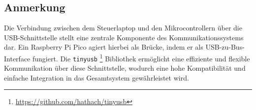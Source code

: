 \subsection{Anmerkung}\label{text:Methodik:Kommunikation:Anmerkung}

Die Verbindung zwischen dem Steuerlaptop und den Mikrocontrollern über die USB-Schnittstelle stellt eine zentrale Komponente des Kommunikationssystems dar. Ein Raspberry Pi Pico agiert hierbei als Brücke, indem er als USB-zu-Bus-Interface fungiert. Die \lstinline{tinyusb} \footnote{\url{https://github.com/hathach/tinyusb}} Bibliothek ermöglicht eine effiziente und flexible Kommunikation über diese Schnittstelle, wodurch eine hohe Kompatibilität und einfache Integration in das Gesamtsystem gewährleistet wird.
